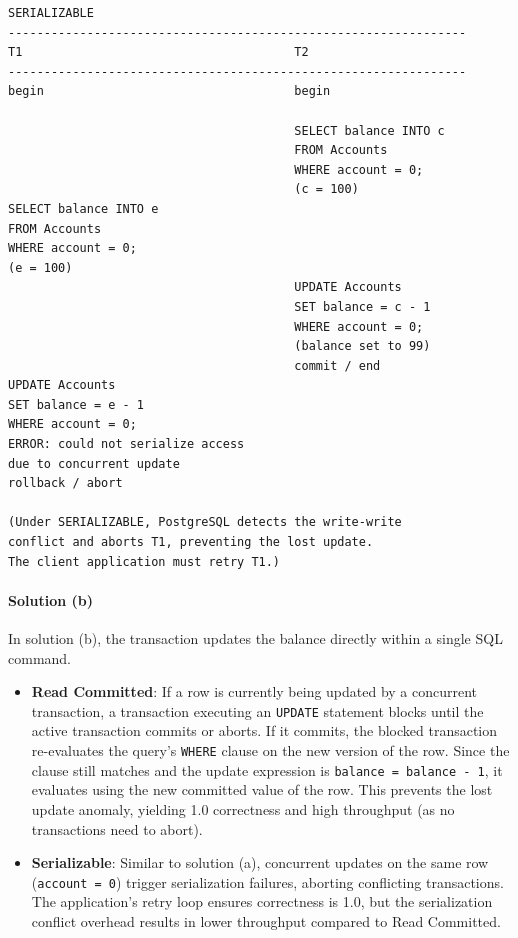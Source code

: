 \documentclass[11pt]{scrartcl}
\begin{document}
\begin{verbatim}
SERIALIZABLE
----------------------------------------------------------------
T1                                      T2
----------------------------------------------------------------
begin                                   begin

                                        SELECT balance INTO c 
                                        FROM Accounts 
                                        WHERE account = 0;
                                        (c = 100)
SELECT balance INTO e 
FROM Accounts 
WHERE account = 0;
(e = 100)
                                        UPDATE Accounts 
                                        SET balance = c - 1 
                                        WHERE account = 0;
                                        (balance set to 99)
                                        commit / end
UPDATE Accounts 
SET balance = e - 1 
WHERE account = 0;
ERROR: could not serialize access 
due to concurrent update
rollback / abort

(Under SERIALIZABLE, PostgreSQL detects the write-write 
conflict and aborts T1, preventing the lost update. 
The client application must retry T1.)
\end{verbatim}

\paragraph{Solution (b)}\mbox{}

In solution (b), the transaction updates the balance directly within a single SQL command.
\begin{itemize}
  \item \textbf{Read Committed}: If a row is currently being updated by a concurrent transaction, a transaction executing an \lstinline[style=dbtsql]{UPDATE} statement blocks until the active transaction commits or aborts. If it commits, the blocked transaction re-evaluates the query's \lstinline[style=dbtsql]{WHERE} clause on the new version of the row. Since the clause still matches and the update expression is \lstinline[style=dbtsql]{balance = balance - 1}, it evaluates using the new committed value of the row. This prevents the lost update anomaly, yielding 1.0 correctness and high throughput (as no transactions need to abort).
  \item \textbf{Serializable}: Similar to solution (a), concurrent updates on the same row (\lstinline[style=dbtsql]{account = 0}) trigger serialization failures, aborting conflicting transactions. The application's retry loop ensures correctness is 1.0, but the serialization conflict overhead results in lower throughput compared to Read Committed.
\end{itemize}
\end{document}
